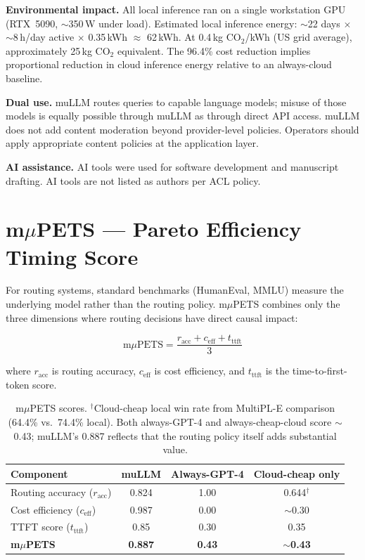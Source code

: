 \documentclass[11pt]{article}
\begin{document}
\textbf{Environmental impact.} All local inference ran on a single
workstation GPU (RTX~5090, $\sim$350\,W under load). Estimated local
inference energy: $\sim$22 days $\times$ $\sim$8\,h/day active $\times$
0.35\,kWh $\approx$ 62\,kWh. At 0.4\,kg CO$_2$/kWh (US grid average),
approximately 25\,kg CO$_2$ equivalent. The 96.4\% cost reduction
implies proportional reduction in cloud inference energy relative to an
always-cloud baseline.

\textbf{Dual use.} muLLM routes queries to capable language models;
misuse of those models is equally possible through muLLM as through
direct API access. muLLM does not add content moderation beyond
provider-level policies. Operators should apply appropriate content
policies at the application layer.

\textbf{AI assistance.} AI tools were used for software development and
manuscript drafting. AI tools are not listed as authors per ACL policy.

\appendix

\section{m$\mu$PETS --- Pareto Efficiency Timing Score}

For routing systems, standard benchmarks (HumanEval, MMLU) measure the
underlying model rather than the routing policy. m$\mu$PETS combines
only the three dimensions where routing decisions have direct causal
impact:

\[
\text{m}\mu\text{PETS} = \frac{r_{\text{acc}} + c_{\text{eff}} + t_{\text{ttft}}}{3}
\]

where $r_{\text{acc}}$ is routing accuracy, $c_{\text{eff}}$ is cost
efficiency, and $t_{\text{ttft}}$ is the time-to-first-token score.

\begin{table}[h]
\centering
\small
\begin{tabular}{lccc}
\toprule
\textbf{Component} & \textbf{muLLM} & \textbf{Always-GPT-4} & \textbf{Cloud-cheap only} \\
\midrule
Routing accuracy ($r_{\text{acc}}$) & 0.824 & 1.00 & 0.644$^\dagger$ \\
Cost efficiency ($c_{\text{eff}}$) & 0.987 & 0.00 & $\sim$0.30 \\
TTFT score ($t_{\text{ttft}}$) & 0.85 & 0.30 & 0.35 \\
\midrule
\textbf{m$\mu$PETS} & \textbf{0.887} & \textbf{0.43} & \textbf{$\sim$0.43} \\
\bottomrule
\end{tabular}
\caption{m$\mu$PETS scores. $^\dagger$Cloud-cheap local win rate from MultiPL-E comparison (64.4\% vs.\ 74.4\% local). Both always-GPT-4 and always-cheap-cloud score $\sim$0.43; muLLM's 0.887 reflects that the routing policy itself adds substantial value.}
\label{tab:mpets}
\end{table}
\end{document}
